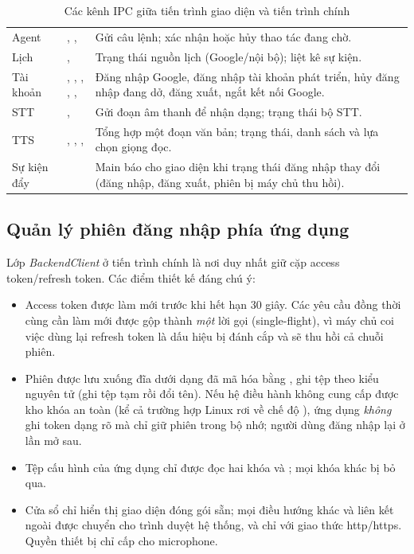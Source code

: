 \begin{table}[!htbp]
\caption{Các kênh IPC giữa tiến trình giao diện và tiến trình chính}\label{tab:ipc}
\bang
\begin{tabularx}{\textwidth}{|L{2.0cm}|L{5.3cm}|Y|}\hline
{} &  & \\\hline
Agent & , ,  & Gửi câu lệnh; xác nhận hoặc hủy thao tác đang chờ.\\\hline
Lịch & ,  & Trạng thái nguồn lịch (Google/nội bộ); liệt kê sự kiện.\\\hline
Tài khoản & , , , , ,  & Đăng nhập Google, đăng nhập tài khoản phát triển, hủy đăng nhập đang dở, đăng xuất, ngắt kết nối Google.\\\hline
STT & ,  & Gửi đoạn âm thanh để nhận dạng; trạng thái bộ STT.\\\hline
TTS & , , ,  & Tổng hợp một đoạn văn bản; trạng thái, danh sách và lựa chọn giọng đọc.\\\hline
Sự kiện đẩy &  & Main báo cho giao diện khi trạng thái đăng nhập thay đổi (đăng nhập, đăng xuất, phiên bị máy chủ thu hồi).\\\hline
\end{tabularx}
\end{table}

\subsection{Quản lý phiên đăng nhập phía ứng dụng}
Lớp \textit{BackendClient} ở tiến trình chính là nơi duy nhất giữ cặp access token/refresh token. Các điểm thiết kế đáng chú ý:
\begin{itemize}
  \item Access token được làm mới trước khi hết hạn 30 giây. Các yêu cầu đồng thời cùng cần làm mới được gộp thành \textit{một} lời gọi (single-flight), vì máy chủ coi việc dùng lại refresh token là dấu hiệu bị đánh cắp và sẽ thu hồi cả chuỗi phiên.
  \item Phiên được lưu xuống đĩa dưới dạng đã mã hóa bằng , ghi tệp theo kiểu nguyên tử (ghi tệp tạm rồi đổi tên). Nếu hệ điều hành không cung cấp được kho khóa an toàn (kể cả trường hợp Linux rơi về chế độ ), ứng dụng \textit{không} ghi token dạng rõ mà chỉ giữ phiên trong bộ nhớ; người dùng đăng nhập lại ở lần mở sau.
  \item Tệp cấu hình  của ứng dụng chỉ được đọc hai khóa  và ; mọi khóa khác bị bỏ qua.
  \item Cửa sổ chỉ hiển thị giao diện đóng gói sẵn; mọi điều hướng khác và liên kết ngoài được chuyển cho trình duyệt hệ thống, và chỉ với giao thức http/https. Quyền thiết bị chỉ cấp cho microphone.
\end{itemize}

